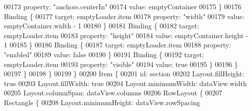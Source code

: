 \begin{DoxyCode}
{00173 \textcolor{comment}{                                    property: "anchors.centerIn"}
00174 \textcolor{comment}{                                    value: emptyContainer}
00175 \textcolor{comment}{                                \}}
00176 \textcolor{comment}{                                Binding \{}
00177 \textcolor{comment}{                                    target: emptyLoader.item}
00178 \textcolor{comment}{                                    property: "width"}
00179 \textcolor{comment}{                                    value: emptyContainer.width - 1}
00180 \textcolor{comment}{                                \}}
00181 \textcolor{comment}{                                Binding \{}
00182 \textcolor{comment}{                                    target: emptyLoader.item}
00183 \textcolor{comment}{                                    property: "height"}
00184 \textcolor{comment}{                                    value: emptyContainer.height - 1}
00185 \textcolor{comment}{                                \}}
00186 \textcolor{comment}{                                Binding \{}
00187 \textcolor{comment}{                                    target: emptyLoader.item}
00188 \textcolor{comment}{                                    property: "enabled"}
00189 \textcolor{comment}{                                    value: false}
00190 \textcolor{comment}{                                \}}
00191 \textcolor{comment}{                                Binding \{}
00192 \textcolor{comment}{                                    target: emptyLoader.item}
00193 \textcolor{comment}{                                    property: "visible"}
00194 \textcolor{comment}{                                    value: true}
00195 \textcolor{comment}{                                \}}
00196 \textcolor{comment}{                            \}}
00197 \textcolor{comment}{                        \}}
00198 \textcolor{comment}{                    \}}
00199 \textcolor{comment}{                \}}
00200 \textcolor{comment}{                Item \{}
00201 \textcolor{comment}{                    id: section}
00202 \textcolor{comment}{                    Layout.fillHeight: true}
00203 \textcolor{comment}{                    Layout.fillWidth: true}
00204 \textcolor{comment}{                    Layout.minimumWidth: dataView.width}
00205 \textcolor{comment}{                    Layout.columnSpan: dataView.columns}
00206 \textcolor{comment}{                    RowLayout \{}
00207 \textcolor{comment}{                        Rectangle \{}
00208 \textcolor{comment}{                            Layout.minimumHeight: dataView.rowSpacing}
}
\end{DoxyCode}
